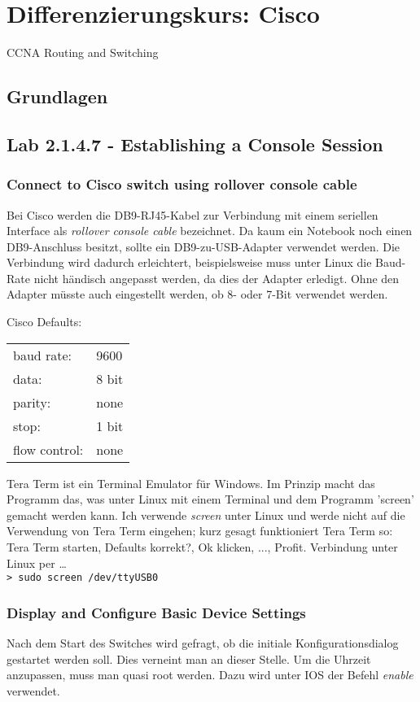 \section{Differenzierungskurs: Cisco}

CCNA Routing and Switching

\subsection{Grundlagen}

\subsection{Lab 2.1.4.7 - Establishing a Console Session}

\subsubsection{Connect to Cisco switch using rollover console cable}
Bei Cisco werden die DB9-RJ45-Kabel zur Verbindung mit einem seriellen Interface als {\it rollover console cable} bezeichnet. Da kaum ein Notebook noch einen DB9-Anschluss besitzt, sollte ein DB9-zu-USB-Adapter verwendet werden. Die Verbindung wird dadurch erleichtert, beispielsweise muss unter Linux die Baud-Rate nicht händisch angepasst werden, da dies der Adapter erledigt. Ohne den Adapter müsste auch eingestellt werden, ob 8- oder 7-Bit verwendet werden.

\noindent Cisco Defaults:
\begin{tabular}{p{3cm}p{3cm}}
baud rate:		& 9600	\\
data: 			& 8 bit	\\
parity: 			& none	\\
stop: 			& 1 bit	\\
flow control:	& none	\\
\end{tabular}

\noindent Tera Term ist ein Terminal Emulator für Windows. Im Prinzip macht das Programm das, was unter Linux mit einem Terminal und dem Programm 'screen' gemacht werden kann. Ich verwende {\it screen} unter Linux und werde nicht auf die Verwendung von Tera Term eingehen; kurz gesagt funktioniert Tera Term so: \ql Tera Term starten, Defaults korrekt?, Ok klicken, ..., Profit.\qr
Verbindung unter Linux per \dots\\
\indent	\verb+> sudo screen /dev/ttyUSB0+

\subsubsection{Display and Configure Basic Device Settings}
Nach dem Start des Switches wird gefragt, ob die initiale Konfigurationsdialog gestartet werden soll. Dies verneint man an dieser Stelle. Um die Uhrzeit anzupassen, muss man quasi root werden. Dazu wird unter IOS der Befehl {\it enable} verwendet.

